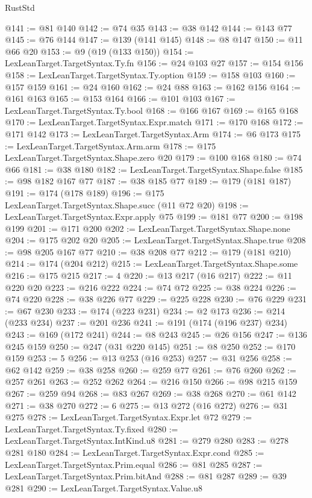 \begin{lexlean}{RustStd}
\begin{coremodule}
@141 := @81 @140
@142 := @74 @35
@143 := @38 @142
@144 := @143 @77
@145 := @76 @144
@147 := @139 (@141 @145)
@148 := @8 @147
@150 := @11 @66 @20
@153 := @9 (@19 (@133 @150))
@154 := LexLeanTarget.TargetSyntax.Ty.fn
@156 := @24 @103 @27
@157 := @154 @156
@158 := LexLeanTarget.TargetSyntax.Ty.option
@159 := @158 @103
@160 := @157 @159
@161 := @24 @160
@162 := @24 @88
@163 := @162 @156
@164 := @161 @163
@165 := @153 @164
@166 := @101 @103
@167 := LexLeanTarget.TargetSyntax.Ty.bool
@168 := @166 @167
@169 := @165 @168
@170 := LexLeanTarget.TargetSyntax.Expr.match
@171 := @170 @168
@172 := @171 @142
@173 := LexLeanTarget.TargetSyntax.Arm
@174 := @6 @173
@175 := LexLeanTarget.TargetSyntax.Arm.arm
@178 := @175 LexLeanTarget.TargetSyntax.Shape.zero @20
@179 := @100 @168
@180 := @74 @66
@181 := @38 @180
@182 := LexLeanTarget.TargetSyntax.Shape.false
@185 := @98 @182 @167 @77
@187 := @38 @185 @77
@189 := @179 (@181 @187)
@191 := @174 (@178 @189)
@196 := @175 LexLeanTarget.TargetSyntax.Shape.succ (@11 @72 @20)
@198 := LexLeanTarget.TargetSyntax.Expr.apply @75
@199 := @181 @77
@200 := @198 @199
@201 := @171 @200
@202 := LexLeanTarget.TargetSyntax.Shape.none
@204 := @175 @202 @20
@205 := LexLeanTarget.TargetSyntax.Shape.true
@208 := @98 @205 @167 @77
@210 := @38 @208 @77
@212 := @179 (@181 @210)
@214 := @174 (@204 @212)
@215 := LexLeanTarget.TargetSyntax.Shape.some
@216 := @175 @215
@217 := 4
@220 := @13 @217 (@16 @217)
@222 := @11 @220 @20
@223 := @216 @222
@224 := @74 @72
@225 := @38 @224
@226 := @74 @220
@228 := @38 @226 @77
@229 := @225 @228
@230 := @76 @229
@231 := @67 @230
@233 := @174 (@223 @231)
@234 := @2 @173
@236 := @214 (@233 @234)
@237 := @201 @236
@241 := @191 (@174 (@196 @237) @234)
@243 := @169 (@172 @241)
@244 := @8 @243
@245 := @26 @156
@247 := @136 @245 @159
@250 := @247 (@31 @220 @145)
@251 := @8 @250
@252 := @170 @159
@253 := 5
@256 := @13 @253 (@16 @253)
@257 := @31 @256
@258 := @62 @142
@259 := @38 @258
@260 := @259 @77
@261 := @76 @260
@262 := @257 @261
@263 := @252 @262
@264 := @216 @150
@266 := @98 @215 @159
@267 := @259 @94
@268 := @83 @267
@269 := @38 @268
@270 := @61 @142
@271 := @38 @270
@272 := 6
@275 := @13 @272 (@16 @272)
@276 := @31 @275
@278 := LexLeanTarget.TargetSyntax.Expr.let @72
@279 := LexLeanTarget.TargetSyntax.Ty.fixed
@280 := LexLeanTarget.TargetSyntax.IntKind.u8
@281 := @279 @280
@283 := @278 @281 @180
@284 := LexLeanTarget.TargetSyntax.Expr.cond
@285 := LexLeanTarget.TargetSyntax.Prim.equal
@286 := @81 @285
@287 := LexLeanTarget.TargetSyntax.Prim.bitAnd
@288 := @81 @287
@289 := @39 @281
@290 := LexLeanTarget.TargetSyntax.Value.u8

\end{coremodule}
\end{lexlean}
